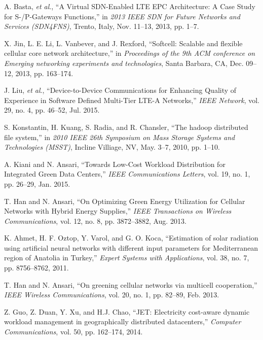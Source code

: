 \documentclass[journal,12pt,draftclsnofoot,onecolumn]{IEEEtran}
\begin{document}
\begin{thebibliography}{1}
A. Basta, \emph{et al}., ``A Virtual SDN-Enabled LTE EPC Architecture: A Case Study for S-/P-Gateways Functions,'' in \emph{2013 IEEE SDN for Future Networks and Services (SDN4FNS)}, Trento, Italy, Nov. 11--13, 2013, pp. 1--7.

X. Jin, L. E. Li, L. Vanbever, and J. Rexford, ``Softcell: Scalable and flexible cellular core network architecture,'' in \emph{Proceedings of the 9th ACM conference on Emerging networking experiments and technologies}, Santa Barbara, CA, Dec. 09--12, 2013, pp. 163--174.

J. Liu, \emph{et al}., ``Device-to-Device Communications for Enhancing Quality of Experience in Software Defined Multi-Tier LTE-A Networks,'' \emph{IEEE Network}, vol. 29, no. 4, pp. 46--52, Jul. 2015.

S. Konstantin, H. Kuang, S. Radia, and R. Chansler, ``The hadoop distributed file system,'' in \emph{2010 IEEE 26th Symposium on Mass Storage Systems and Technologies (MSST)}, Incline Villiage, NV, May. 3--7, 2010, pp. 1--10.

A. Kiani and N. Ansari, ``Towards Low-Cost Workload Distribution for Integrated Green Data Centers,'' \emph{IEEE Communications Letters}, vol. 19, no. 1, pp. 26--29, Jan. 2015.

T. Han and N. Ansari, ``On Optimizing Green Energy Utilization for Cellular Networks with Hybrid Energy Supplies,'' \emph{IEEE Transactions on Wireless Communications}, vol. 12, no. 8, pp. 3872--3882, Aug. 2013.

K. Ahmet, H. F. Oztop, Y. Varol, and G. O. Koca, ``Estimation of solar radiation using artificial neural networks with different input parameters for Mediterranean region of Anatolia in Turkey,'' \emph{Expert Systems with Applications}, vol. 38, no. 7, pp. 8756--8762, 2011.

T. Han and N. Ansari, ``On greening cellular networks via multicell cooperation,'' \emph{IEEE Wireless Communications}, vol. 20, no. 1, pp. 82--89, Feb. 2013.

Z. Guo, Z. Duan, Y. Xu, and H.J. Chao, ``JET: Electricity cost-aware dynamic workload management in geographically distributed datacenters,'' \emph{Computer Communications}, vol. 50, pp. 162--174, 2014.


\end{thebibliography}
\end{document}
